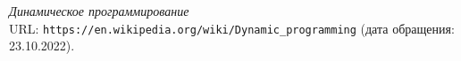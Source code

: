 \begin{thebibliography}{99}
{\itshape Динамическое программирование} \\URL: \texttt{https://en.wikipedia.org/wiki/Dynamic\_programming} (дата обращения: 23.10.2022).
\end{thebibliography}
\pagebreak


